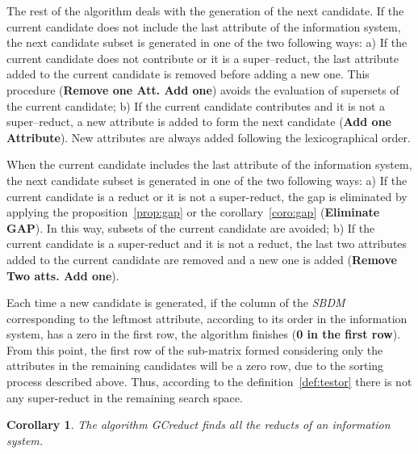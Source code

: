 \documentclass[number,preprint,review,12pt]{elsarticle}
\newtheorem{corollary}{Corollary}
\begin{document}
	The rest of the algorithm deals with the generation of the next candidate. If the current candidate does not include the last attribute of the information system, the next candidate subset is generated in one of the two following ways: a) If the current candidate does not contribute or it is a super--reduct, the last attribute added to the current candidate is removed before adding a new one. This procedure (\textbf{Remove one Att. Add one}) avoids the evaluation of supersets of the current candidate; b) If the current candidate contributes and it is not a super--reduct, a new attribute is added to form the next candidate (\textbf{Add one Attribute}). New attributes are always added following the lexicographical order. 
	
	When the current candidate includes the last attribute of the information system, the next candidate subset is generated in one of the two following ways: a) If the current candidate is a reduct or it is not a super-reduct, the gap is eliminated by applying the proposition~\ref{prop:gap} or the corollary~\ref{coro:gap} (\textbf{Eliminate GAP}). In this way, subsets of the current candidate are avoided; b) If the current candidate is a super-reduct and it is not a reduct, the last two attributes added to the current candidate are removed and a new one is added (\textbf{Remove Two atts. Add one}).
	
	Each time a new candidate is generated, if the column of the \textit{SBDM} corresponding to the leftmost attribute, according to its order in the information system, has a zero in the first row, the algorithm finishes (\textbf{0 in the first row}). From this point, the first row of the sub-matrix formed considering only the attributes in the remaining candidates will be a zero row, due to the sorting process described above. Thus, according to the definition~\ref{def:testor} there is not any super-reduct in the remaining search space.
	
	\begin{corollary}
		The algorithm GCreduct finds all the reducts of an information system.
	\end{corollary}
	
\end{document}
